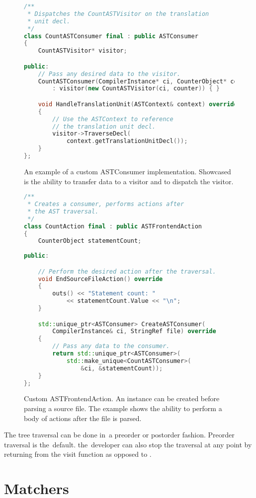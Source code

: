 \begin{figure}[ht]\centering
\begin{lstlisting}[caption=ASTConsumer., language=C++, 
label={lst:astconsumer}]
/**
 * Dispatches the CountASTVisitor on the translation 
 * unit decl.
 */
class CountASTConsumer final : public ASTConsumer
{
	CountASTVisitor* visitor;

public:
	// Pass any desired data to the visitor.
	CountASTConsumer(CompilerInstance* ci, CounterObject* counter)
		: visitor(new CountASTVisitor(ci, counter)) { }

	void HandleTranslationUnit(ASTContext& context) override
	{
		// Use the ASTContext to reference 
		// the translation unit decl.
		visitor->TraverseDecl(
			context.getTranslationUnitDecl());
	}
};
\end{lstlisting}
\caption{An example of a custom ASTConsumer implementation.
Showcased is the ability to transfer data to a visitor and
to dispatch the visitor.}
\label{lst:astconsumer}
\end{figure}

\begin{figure}[ht]\centering
\begin{lstlisting}[language=C++]
/**
 * Creates a consumer, performs actions after 
 * the AST traversal.
 */
class CountAction final : public ASTFrontendAction
{
	CounterObject statementCount;
	
public:

	// Perform the desired action after the traversal.
	void EndSourceFileAction() override
	{
		outs() << "Statement count: " 
			<< statementCount.Value << "\n";
	}

	std::unique_ptr<ASTConsumer> CreateASTConsumer(
		CompilerInstance& ci, StringRef file) override
	{
		// Pass any data to the consumer.
		return std::unique_ptr<ASTConsumer>(
			std::make_unique<CountASTConsumer>(
				&ci, &statementCount));
	}
};
\end{lstlisting}
\caption{Custom ASTFrontendAction. An instance can be created before
parsing a source file. The example shows the ability to perform
a body of actions after the file is parsed.}
\label{lst:astfrontendaction}
\end{figure}

The tree traversal can be done in~a preorder or postorder fashion. 
Preorder traversal is the~default. the~developer can also stop
the traversal at any point by returning  from
the visit function as opposed to .

\section{Matchers}

